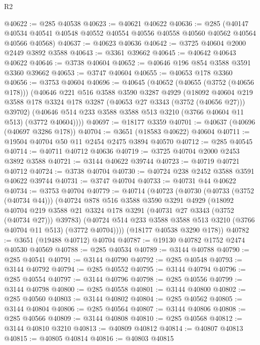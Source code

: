 \begin{lexlean}{R2}
\begin{coremodule}
@40622 := @285 @40538
@40623 := @40621 @40622
@40636 := @285
    (@40147 @40534 @40541 @40548 @40552 @40554 @40556 @40558 @40560 @40562 @40564 @40566 @40568)
@40637 := @40623 @40636
@40642 := @3725 @40604 @2000 @2449 @3892 @3588
@40643 := @3361 @39662
@40645 := @40642 @40643 @40622
@40646 := @3738 @40604
@40652 := @40646 @196 @854 @3588 @3591 @3360 @39662
@40653 := @3747 @40604
@40655 := @40653 @178 @3360
@40656 := @3753 @40604
@40696 := @40645
    (@40652
      (@40655 (@3752 (@40656 @178)))
      (@40646
        @221
        @516
        @3588
        @3590
        @3287
        @4929
        (@18092
          @40604
          @219
          @3588
          @178
          @3324
          @178
          @3287
          (@40653 @27 @3343 (@3752 (@40656 @27)))
          @39702)
        (@40646 @514 @233 @3588 @3588 @513 @3210 (@3766 @40604 @11 @513) (@3772 @40604))))
@40697 := @18177 @3359
@40701 := @40637 (@40696 (@40697 @3286 @178))
@40704 := @3651 (@18583 @40622) @40604
@40711 := @19504 @40704 @50 @11 @2454 @2475 @3894 @40570
@40712 := @285 @40545
@40714 := @40711 @40712 @40636
@40719 := @3725 @40704 @2000 @2453 @3892 @3588
@40721 := @3144 @40622 @39744
@40723 := @40719 @40721 @40712
@40724 := @3738 @40704
@40730 := @40724 @238 @2452 @3588 @3591 @40622 @39744
@40731 := @3747 @40704
@40733 := @40731 @44 @40622
@40734 := @3753 @40704
@40779 := @40714
    (@40723
      (@40730
        (@40733 (@3752 (@40734 @44)))
        (@40724
          @878
          @516
          @3588
          @3590
          @3291
          @4929
          (@18092
            @40704
            @219
            @3588
            @21
            @3324
            @178
            @3291
            (@40731 @27 @3343 (@3752 (@40734 @27)))
            @39783)
          (@40724 @514 @233 @3588 @3588 @513 @3210 (@3766 @40704 @11 @513) (@3772 @40704))))
      (@18177 @40538 @3290 @178))
@40782 := @3651 (@19488 @40712) @40704
@40787 := @19130 @40782 @1752 @2474 @40530 @40569
@40788 := @285 @40534
@40789 := @3144 @40788
@40790 := @285 @40541
@40791 := @3144 @40790
@40792 := @285 @40548
@40793 := @3144 @40792
@40794 := @285 @40552
@40795 := @3144 @40794
@40796 := @285 @40554
@40797 := @3144 @40796
@40798 := @285 @40556
@40799 := @3144 @40798
@40800 := @285 @40558
@40801 := @3144 @40800
@40802 := @285 @40560
@40803 := @3144 @40802
@40804 := @285 @40562
@40805 := @3144 @40804
@40806 := @285 @40564
@40807 := @3144 @40806
@40808 := @285 @40566
@40809 := @3144 @40808
@40810 := @285 @40568
@40812 := @3144 @40810 @3210
@40813 := @40809 @40812
@40814 := @40807 @40813
@40815 := @40805 @40814
@40816 := @40803 @40815

\end{coremodule}
\end{lexlean}

